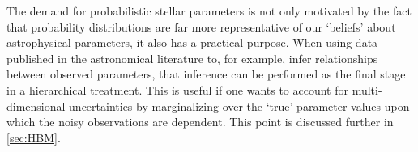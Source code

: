 The demand for probabilistic stellar parameters is not only motivated by the
fact that probability distributions are far more representative of our
`beliefs' about astrophysical parameters, it also has a practical purpose.
When using data published in the astronomical literature to, for example, infer
relationships between observed parameters, that inference can be performed as
the final stage in a hierarchical treatment.
This is useful if one wants to account for multi-dimensional uncertainties by
marginalizing over the `true' parameter values upon which the noisy
observations are dependent.
This point is discussed further in \textsection\ref{sec:HBM}.

